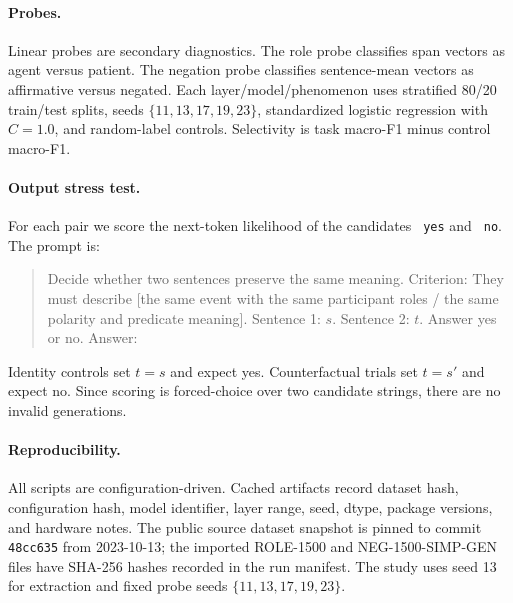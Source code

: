 \documentclass{article}
\begin{document}
\paragraph{Probes.}
Linear probes are secondary diagnostics. The role probe classifies span vectors as agent versus patient. The negation probe classifies sentence-mean vectors as affirmative versus negated. Each layer/model/phenomenon uses stratified 80/20 train/test splits, seeds $\{11,13,17,19,23\}$, standardized logistic regression with $C=1.0$, and random-label controls. Selectivity is task macro-F1 minus control macro-F1.

\paragraph{Output stress test.}
For each pair we score the next-token likelihood of the candidates \texttt{ yes} and \texttt{ no}. The prompt is:
\begin{quote}\small
Decide whether two sentences preserve the same meaning. Criterion: They must describe [the same event with the same participant roles / the same polarity and predicate meaning]. Sentence 1: $s$. Sentence 2: $t$. Answer yes or no. Answer:
\end{quote}
Identity controls set $t=s$ and expect yes. Counterfactual trials set $t=s'$ and expect no. Since scoring is forced-choice over two candidate strings, there are no invalid generations.

\paragraph{Reproducibility.}
All scripts are configuration-driven. Cached artifacts record dataset hash, configuration hash, model identifier, layer range, seed, dtype, package versions, and hardware notes. The public source dataset snapshot is pinned to commit \texttt{48cc635} from 2023-10-13; the imported ROLE-1500 and NEG-1500-SIMP-GEN files have SHA-256 hashes recorded in the run manifest. The study uses seed 13 for extraction and fixed probe seeds $\{11,13,17,19,23\}$.
\end{document}
